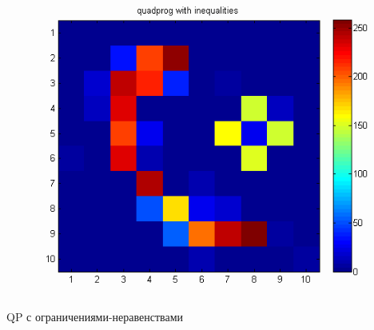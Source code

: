 \documentclass[12pt]{beamer}
\begin{document}
\begin{frame}
\begin{columns}[T,onlytextwidth]
\begin{column}{0.4\textwidth}
    \begin{figure}
    \centering
    \includegraphics[width=\textwidth]{qp_qp_ineq}
  \end{figure}
  QP с ограничениями-неравенствами
\end{column}
\end{columns}

\end{frame}
\end{document}
